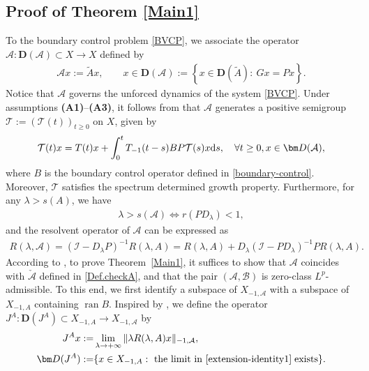\documentclass[onecolumn]{autart}
\def\la{\lambda}
\def\calT{{\mathcal{T}}}
\def\calA{{\mathcal{A}}}
\numberwithin{equation}{section}
\begin{document}
	\subsection{Proof of Theorem \ref{Main1}}
	To the boundary control problem \eqref{BVCP}, we associate the operator $\calA : {\bm D}(\calA) \subset X \to X$ defined by
	\begin{align}\label{def:A}
		\calA x := \tilde{A}x, \qquad x \in {\bm D}(\calA) := \left\{x \in {\bm D}(\tilde{A}) : \ Gx = Px\right\}.
	\end{align}
	Notice that $\mathcal{A}$ governs the unforced dynamics of the system \eqref{BVCP}. Under assumptions {\bf (A1)}--{\bf (A3)}, it follows from \cite[Thm. 1]{El1} that $\calA$ generates a positive semigroup $\calT:=(\calT(t))_{t\ge 0}$ on $X$, given by
	\begin{align*}%
		\calT(t)x = T(t)x + \int_{0}^{t} T_{-1}(t-s) B P \calT(s)x  {\rm{d}}s, \quad \forall t\ge 0, x \in {\bm D}(\calA),
	\end{align*}
	 where $B$ is the boundary control operator defined in \eqref{boundary-control}. Moreover, $\mathcal{T}$ satisfies the spectrum determined growth property. Furthermore, for any $\la>s(A)$, we have
	\begin{align*}
		\lambda>s(\calA)\iff r(PD_\la)<1,
	\end{align*}
    and the resolvent operator of $\mathcal{A}$ can be expressed as
 	\begin{align}\label{resolvent-operator}
		R(\lambda, \calA) = (\mathcal{I}-D_\lambda P)^{-1} R(\lambda, A)
		= R(\lambda, A) + D_\lambda (\mathcal{I}-P D_\lambda)^{-1} P R(\lambda, A).
	\end{align}
	According to \cite[Prop.~2.5]{JaNPS}, to prove Theorem~\ref{Main1}, it suffices to show that $\mathcal{A}$ coincides with $\check{\mathcal{A}}$ defined in \eqref{Def.checkA}, and that the pair $(\mathcal{A}, \mathcal{B})$ is zero-class $L^p$-admissible. To this end, we first identify a subspace of $X_{-1,\mathcal{A}}$ with a subspace of $X_{-1,A}$ containing $\operatorname{ran} B$. Inspired by \cite[Sect.~7]{WF}, we define the operator $J^A: {\bm D}(J^A) \subset X_{-1,A} \to X_{-1,\mathcal{A}}$ by
\begin{subequations}
	\begin{align}
		 J^Ax:=&\lim_{\la \to +\infty} \Vert \la R(\la,A)x\Vert_{-1,\calA},\label{extension-identity1}\\
		 {\bm D}(J^A):=&\{x\in X_{-1,A}:\text{ the limit in } \eqref{extension-identity1}\; {\rm exists}\}\label{extension-identity2}.
	\end{align}
\end{subequations}
\end{document}
